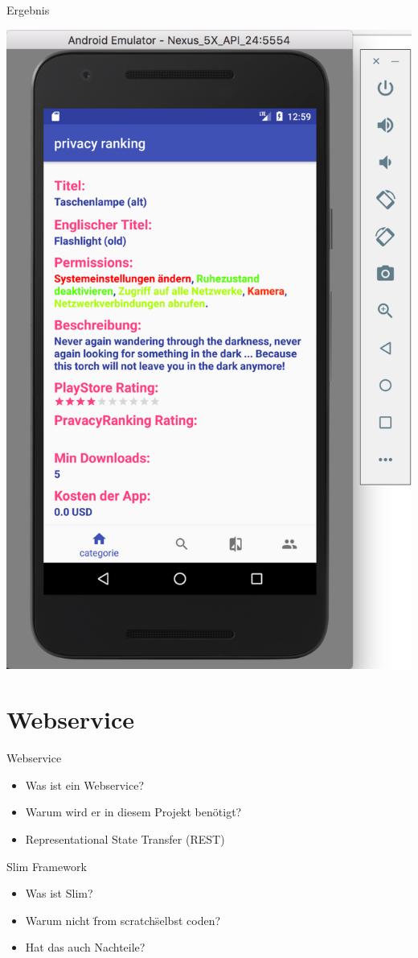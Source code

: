 \documentclass[compress,t]{beamer}
\begin{document}
\begin{frame}[fragile]{Ergebnis}
     
    \begin{center}
        \includegraphics[width=.45\textwidth]{img/handy.png}
    \end{center}   

\end{frame}




\section{Webservice}

\begin{frame}{Webservice}

    \begin{center}
        \begin{itemize}
            \item Was ist ein Webservice?
            \item Warum wird er in diesem Projekt benötigt?
            \item Representational State Transfer (REST)
        \end{itemize}
    \end{center}

\end{frame}

\begin {frame}{Slim Framework}

    \begin{center}
        \begin{itemize}
            \item Was ist Slim?
            \item Warum nicht \"from scratch\" selbst coden?
            \item Hat das auch Nachteile?
        \end{itemize}
    \end{center}

\end{frame}
\end{document}
